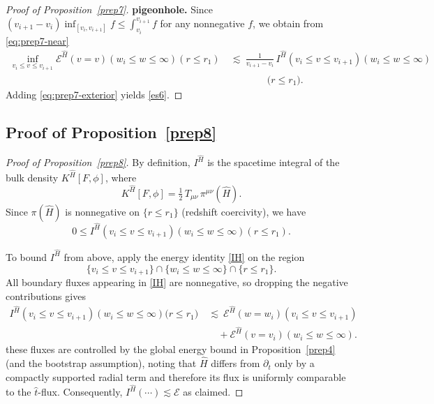 \documentclass[11pt]{article}
\numberwithin{equation}{section}
\theoremstyle{plain}
\theoremstyle{definition}
\theoremstyle{remark}
\begin{document}
\begin{proof}[Proof of Proposition~\ref{prep7}]
\smallskip
\noindent\textbf{pigeonhole.}
Since $(v_{i+1}-v_i)\inf_{[v_i,v_{i+1}]} f\le \int_{v_i}^{v_{i+1}} f$ for any nonnegative $f$, we obtain from \eqref{eq:prep7-near}
\begin{eqnarray}
\inf_{v_i\le v\le v_{i+1}}\mathcal E^{\hat H}(v=v)(w_i\le w\le\infty)(r\le r_1)
&\ \lesssim\ \frac{1}{v_{i+1}-v_i}\,
I^{\hat H}(v_i\le v\le v_{i+1})(w_i\le w\le\infty)\\
&\qquad\qquad\bigl(r\le r_1\bigr).
\end{eqnarray}
Adding \eqref{eq:prep7-exterior} yields \eqref{es6}.
\end{proof}
\subsection{Proof of Proposition~\ref{prep8}}
\label{app:proof-prep8}

\begin{proof}[Proof of Proposition~\ref{prep8}]
By definition, $I^{\hat H}$ is the spacetime integral of the bulk density $K^{\hat H}[F,\phi]$, where
\begin{equation}
K^{\hat H}[F,\phi]=\tfrac12\,T_{\mu\nu}\,\pi^{\mu\nu}(\hat H).
\end{equation}
Since $\pi(\hat H)$ is nonnegative on $\{r\le r_1\}$ (redshift coercivity), we have
\begin{equation}
0\le I^{\hat H}(v_i\le v\le v_{i+1})(w_i\le w\le\infty)(r\le r_1).
\end{equation}

To bound $I^{\hat H}$ from above, apply the energy identity \eqref{IH} on the region
\begin{equation}
\{v_i\le v\le v_{i+1}\}\cap\{w_i\le w\le\infty\}\cap\{r\le r_1\}.
\end{equation}
All boundary fluxes appearing in \eqref{IH} are nonnegative, so dropping the negative contributions gives
\begin{eqnarray}
I^{\hat H}(v_i\le v\le v_{i+1})(w_i\le w\le\infty)\bigl(r\le r_1\bigr)
\ &\lesssim\ \mathcal E^{\hat H}(w=w_i)(v_i\le v\le v_{i+1})\\
&\quad+\mathcal E^{\hat H}(v=v_i)(w_i\le w\le\infty).
\end{eqnarray}
these fluxes are controlled by the global energy bound in Proposition~\ref{prep4} (and the bootstrap assumption), noting that $\hat H$ differs from $\partial_t$ only by a compactly supported radial term and therefore its flux is uniformly comparable to the $\hat t$-flux.
Consequently, $I^{\hat H}(\cdots)\lesssim\mathcal E$ as claimed.
\end{proof}
\end{document}
